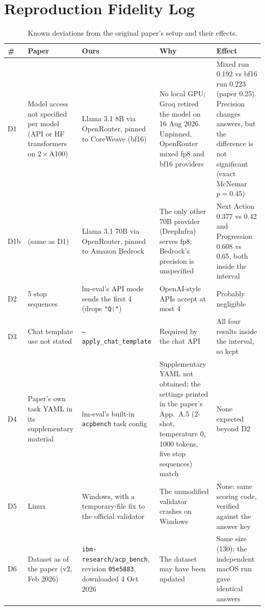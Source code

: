 \section{Reproduction Fidelity Log}
\label{app:fidelity}

\begin{table}[ht]
\centering
\caption{Known deviations from the original paper's setup and their effects.}
\label{tab:fidelity}
\footnotesize
\begin{tabular}{@{}p{}p{}p{}p{}p{}@{}}
\toprule
\# & Paper & Ours & Why & Effect \\
\midrule
D1 & Model access not specified per model (API or HF transformers on $2\times$A100) & Llama 3.1 8B via OpenRouter, pinned to CoreWeave (bf16) & No local GPU; Groq retired the model on 16 Aug 2026. Unpinned, OpenRouter mixed fp8 and bf16 providers & Mixed run 0.192 vs bf16 run 0.223 (paper 0.25). Precision changes answers, but the difference is not significant (exact McNemar $p = 0.45$) \\
D1b & (same as D1) & Llama 3.1 70B via OpenRouter, pinned to Amazon Bedrock & The only other 70B provider (DeepInfra) serves fp8; Bedrock's precision is unspecified & Next Action 0.377 vs 0.42 and Progression 0.608 vs 0.65, both inside the interval \\
D2 & 5 stop sequences & lm-eval's API mode sends the first 4 (drops \texttt{"Q:"}) & OpenAI-style APIs accept at most 4 & Probably negligible \\
D3 & Chat template use not stated & \texttt{--apply\_chat\_template} & Required by the chat API & All four results inside the interval, so kept \\
D4 & Paper's own task YAML in its supplementary material & lm-eval's built-in \texttt{acpbench} task config & Supplementary YAML not obtained; the settings printed in the paper's App.~A.5 (2-shot, temperature 0, 1000 tokens, five stop sequences) match & None expected beyond D2 \\
D5 & Linux & Windows, with a temporary-file fix to the official validator & The unmodified validator crashes on Windows & None: same scoring code, verified against the answer key \\
D6 & Dataset as of the paper (v2, Feb 2026) & \texttt{ibm-research/\allowbreak acp\_bench}, revision \texttt{05e5883}, downloaded 4 Oct 2026 & The dataset may have been updated & Same size (130); the independent macOS run gave identical answers \\

\end{tabular}
\end{table}
